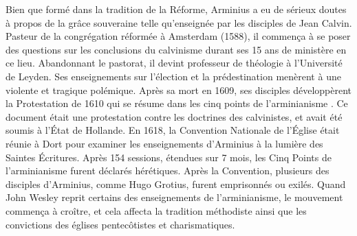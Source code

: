 Bien que formé dans la tradition de la Réforme, Arminius a eu de sérieux doutes
 à propos de \og la grâce souveraine \fg{}  telle qu'enseignée
 par les disciples de Jean Calvin. Pasteur de la congrégation réformée à Amsterdam (1588),
 il commença à se poser des questions sur les conclusions du calvinisme
 durant ses 15 ans de ministère en ce lieu. Abandonnant le pastorat,
 il devint professeur de théologie à l'Université de Leyden.
 Ses enseignements sur l'élection et la prédestination menèrent à une violente
 et tragique polémique. Après sa mort en 1609, ses disciples développèrent la Protestation
 de 1610 qui se résume dans les \og cinq points de l'arminianisme \fg{}.
 Ce document était une protestation contre les doctrines des calvinistes,
 et avait été soumis à l'État de Hollande. En 1618, la Convention Nationale
 de l'Église était réunie à Dort pour examiner les enseignements d'Arminius
 à la lumière des Saintes Écritures. Après 154 sessions, étendues sur 7 mois,
 les Cinq Points de l'arminianisme furent déclarés hérétiques.
 Après la Convention, plusieurs des disciples d'Arminius, comme Hugo Grotius,
 furent emprisonnés ou exilés. Quand John Wesley reprit certains des enseignements
 de l'arminianisme, le mouvement  commença à croître, et cela affecta la tradition méthodiste
 ainsi que les convictions des églises pentecôtistes et charismatiques.

